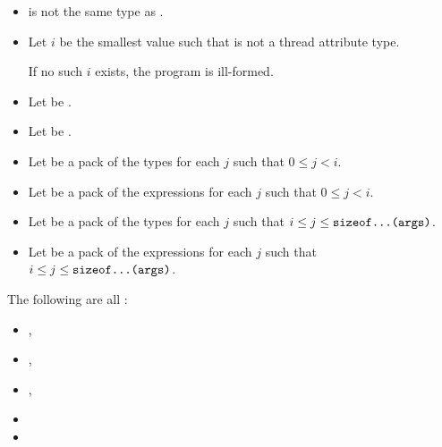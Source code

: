 \documentclass{wg21}
\begin{document}
\begin{itemdescr}

\pnum
\constraints
\begin{itemize}
\item {} is not the same type as .
\end{itemize}

\begin{addedblock}
\begin{itemize}[leftmargin=*]
\item Let $i$ be the smallest value such that  is not a thread attribute type.

If no such $i$ exists, the program is ill-formed.

\item Let  be .
\item Let  be .
\item Let  be a pack of the types  for each $j$ such that $ 0 \leq j < i $.
\item Let  be a pack of the expressions  for each $j$ such that $ 0 \leq j < i $.
\item Let  be a pack of the types  for each $j$ such that $ i \le j \le \texttt{sizeof...(args)}$.
\item Let  be a pack of the expressions  for each $j$ such that $ i \le j \le \texttt{sizeof...(args)}$.
\end{itemize}
\end{addedblock}

\pnum
\mandates
The following are all :
\begin{itemize}
    \item {},
    \item {},
    \item {},
    \item {}
    \item {}
\end{itemize}


\end{itemdescr}
\end{document}
